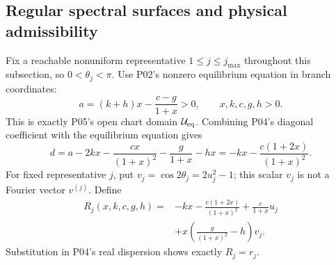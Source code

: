 \documentclass[11pt]{article}
\theoremstyle{definition}
\theoremstyle{remark}
\begin{document}
\subsection{Regular spectral surfaces and physical admissibility}
Fix a reachable nonuniform representative $1\le j\le j_{\max}$
throughout this subsection, so $0<\theta_j<\pi$.
Use P02's nonzero equilibrium equation in branch coordinates:
\begin{equation}
 a=(k+h)x-\frac{c-g}{1+x}>0,\qquad x,k,c,g,h>0.
 \label{eq:P11-chart}
\end{equation}
This is exactly P05's open chart domain $\mathcal U_{\rm eq}$.
Combining P04's diagonal coefficient with the equilibrium equation gives
\[
 d=a-2kx-\frac{cx}{(1+x)^2}-\frac g{1+x}-hx
   =-kx-\frac{c(1+2x)}{(1+x)^2}.
\]
For fixed representative $j$, put $v_j=\cos2\theta_j=2u_j^2-1$;
this scalar $v_j$ is not a Fourier vector $v^{(j)}$. Define
\begin{equation}
 \begin{split}
 R_j(x,k,c,g,h)={}&-kx-\frac{c(1+2x)}{(1+x)^2}
                 +\frac{c}{1+x}u_j\\
                &+x\left(\frac{g}{(1+x)^2}-h\right)v_j.
 \end{split}
 \label{eq:P11-R}
\end{equation}
Substitution in P04's real dispersion shows exactly $R_j=r_j$.
\end{document}
